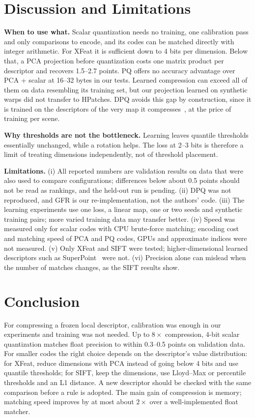 \documentclass[10pt,conference]{IEEEtran}
\begin{document}
\section{Discussion and Limitations}
\textbf{When to use what.} Scalar quantization needs no training, one calibration pass and only comparisons to encode, and its codes can be matched directly with integer arithmetic. For XFeat it is sufficient down to 4 bits per dimension. Below that, a PCA projection before quantization costs one matrix product per descriptor and recovers 1.5--2.7 points. PQ offers no accuracy advantage over PCA + scalar at 16--32 bytes in our tests. Learned compression can exceed all of them on data resembling its training set, but our projection learned on synthetic warps did not transfer to HPatches. DPQ avoids this gap by construction, since it is trained on the descriptors of the very map it compresses~\cite{dpq}, at the price of training per scene.

\textbf{Why thresholds are not the bottleneck.} Learning leaves quantile thresholds essentially unchanged, while a rotation helps. The loss at 2--3 bits is therefore a limit of treating dimensions independently, not of threshold placement.

\textbf{Limitations.} (i) All reported numbers are validation results on data that were also used to compare configurations; differences below about 0.5 points should not be read as rankings, and the held-out run is pending. (ii) DPQ was not reproduced, and GFR is our re-implementation, not the authors' code. (iii) The learning experiments use one loss, a linear map, one or two seeds and synthetic training pairs; more varied training data may transfer better. (iv) Speed was measured only for scalar codes with CPU brute-force matching; encoding cost and matching speed of PCA and PQ codes, GPUs and approximate indices were not measured. (v) Only XFeat and SIFT were tested; higher-dimensional learned descriptors such as SuperPoint~\cite{superpoint} were not. (vi) Precision alone can mislead when the number of matches changes, as the SIFT results show.

\section{Conclusion}
For compressing a frozen local descriptor, calibration was enough in our experiments and training was not needed. Up to $8\times$ compression, 4-bit scalar quantization matches float precision to within 0.3--0.5 points on validation data. For smaller codes the right choice depends on the descriptor's value distribution: for XFeat, reduce dimensions with PCA instead of going below 4 bits and use quantile thresholds; for SIFT, keep the dimensions, use Lloyd--Max or percentile thresholds and an L1 distance. A new descriptor should be checked with the same comparison before a rule is adopted. The main gain of compression is memory; matching speed improves by at most about $2\times$ over a well-implemented float matcher.
\end{document}
